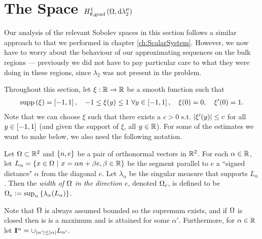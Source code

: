 \section{The Space $H^1_{\theta, \mathrm{grad}}\left( \Omega, \mathrm{d}\lambda_2^{\mu} \right)$} \label{sec:CompSobSpaces}
Our analysis of the relevant Sobolev spaces in this section follows a similar approach to that we performed in chapter \ref{ch:ScalarSystem}.
However, we now have to worry about the behaviour of our approximating sequences on the bulk regions --- previously we did not have to pay particular care to what they were doing in these regions, since $\lambda_2$ was not present in the problem.

Throughout this section, let $\xi:\mathbb{R}\rightarrow\mathbb{R}$ be a smooth function such that
\begin{align*}
	\mathrm{supp}\left( \xi \right) = \left[ -1,1 \right], \quad -1\leq\xi(y)\leq1 \ \forall y\in\left[ -1,1 \right], \quad \xi(0)=0, \quad \xi'(0)=1.
\end{align*}
Note that we can choose $\xi$ such that there exists a $c>0$ s.t. $\left\lvert \xi'(y) \right\rvert\leq c$ for all $y\in\left[ -1,1 \right]$ (and given the support of $\xi$, all $y\in\mathbb{R}$).
For some of the estimates we want to make below, we also need the following notation.
\begin{definition}
	Let $\Omega\subset\mathbb{R}^2$ and $\left\{ n, e \right\}$ be a pair of orthonormal vectors in $\mathbb{R}^2$.
	For each $\alpha\in\mathbb{R}$, let $L_{\alpha} = \left\{ x\in\Omega \ \middle\vert \  x = \alpha n + \beta e, \beta\in\mathbb{R} \right\}$ be the segment parallel to $e$ a ``signed distance" $\alpha$ from the diagonal $e$.
	Let $\lambda_{\alpha}$ be the singular measure that supports $L_{\alpha}$.
	Then the \emph{width of $\Omega$ in the direction $e$}, denoted $\Omega_e$, is defined to be $\Omega_e := \sup_{\alpha}\left\{ \lambda_{\alpha}(L_{\alpha}) \right\}$.
\end{definition}
Note that $\Omega$ is always assumed bounded so the supremum exists, and if $\Omega$ is closed then is is a maximum and is attained for some $\alpha'$.
Furthermore, for $\alpha\in\mathbb{R}$ let $\mathbf{I}^{\alpha} = \cup_{\left\lvert \alpha' \right\rvert\leq\left\lvert \alpha \right\rvert}L_{\alpha'}$.

